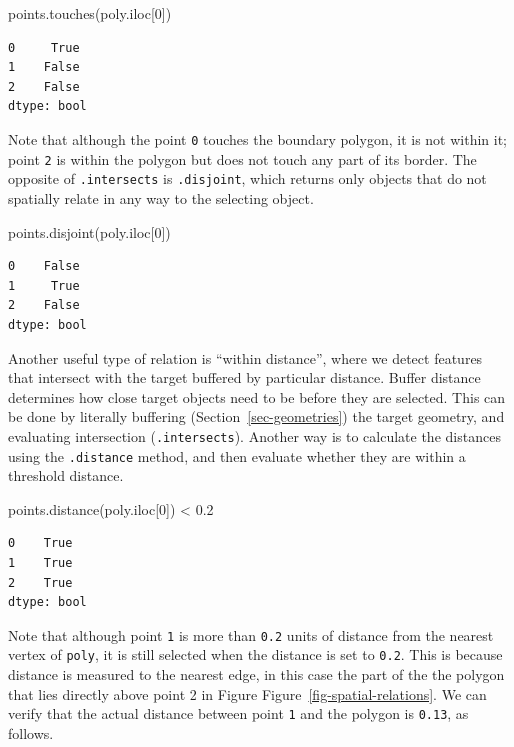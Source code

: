 \documentclass[
  letterpaper,
]{krantz}
\newenvironment{Shaded}{\begin{snugshade}}{\end{snugshade}}
\newcommand{\DecValTok}[1]{\textcolor[rgb]{0.68,0.00,0.00}{#1}}
\newcommand{\FloatTok}[1]{\textcolor[rgb]{0.68,0.00,0.00}{#1}}
\newcommand{\NormalTok}[1]{\textcolor[rgb]{0.00,0.23,0.31}{#1}}
\newcommand{\OperatorTok}[1]{\textcolor[rgb]{0.37,0.37,0.37}{#1}}
\begin{document}
\begin{Shaded}
\begin{Highlighting}[]
\NormalTok{points.touches(poly.iloc[}\DecValTok{0}\NormalTok{])}
\end{Highlighting}
\end{Shaded}

\begin{verbatim}
0     True
1    False
2    False
dtype: bool
\end{verbatim}

Note that although the point \texttt{0} touches the boundary polygon, it
is not within it; point \texttt{2} is within the polygon but does not
touch any part of its border. The opposite of \texttt{.intersects} is
\texttt{.disjoint}, which returns only objects that do not spatially
relate in any way to the selecting object.

\begin{Shaded}
\begin{Highlighting}[]
\NormalTok{points.disjoint(poly.iloc[}\DecValTok{0}\NormalTok{])}
\end{Highlighting}
\end{Shaded}

\begin{verbatim}
0    False
1     True
2    False
dtype: bool
\end{verbatim}

Another useful type of relation is ``within distance'', where we detect
features that intersect with the target buffered by particular distance.
Buffer distance determines how close target objects need to be before
they are selected. This can be done by literally buffering
(Section~\ref{sec-geometries}) the target geometry, and evaluating
intersection (\texttt{.intersects}). Another way is to calculate the
distances using the \texttt{.distance} method, and then evaluate whether
they are within a threshold distance.

\begin{Shaded}
\begin{Highlighting}[]
\NormalTok{points.distance(poly.iloc[}\DecValTok{0}\NormalTok{]) }\OperatorTok{\textless{}} \FloatTok{0.2}
\end{Highlighting}
\end{Shaded}

\begin{verbatim}
0    True
1    True
2    True
dtype: bool
\end{verbatim}

Note that although point \texttt{1} is more than \texttt{0.2} units of
distance from the nearest vertex of \texttt{poly}, it is still selected
when the distance is set to \texttt{0.2}. This is because distance is
measured to the nearest edge, in this case the part of the the polygon
that lies directly above point 2 in Figure
Figure~\ref{fig-spatial-relations}. We can verify that the actual
distance between point \texttt{1} and the polygon is \texttt{0.13}, as
follows.
\end{document}
